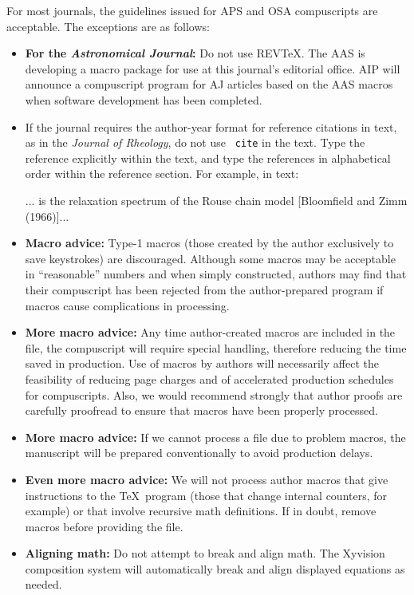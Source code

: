 For most journals, the guidelines issued for APS and OSA compuscripts are
acceptable.  The exceptions are as follows:
\begin{itemize}

\item{\bf For the {\em Astronomical Journal}:} Do not use REV\TeX .  The
AAS is developing a macro package for use at this journal's editorial
office.  AIP will announce a compuscript program for AJ articles based on
the AAS macros when software development has been completed.

\item If the journal requires the author-year format for reference
citations in text, as in the {\em Journal of Rheology}, do not use {\tt
cite} in the text.  Type the reference explicitly within the text, and type
the references in alphabetical order within the reference section. For
example, in text:


      ... is the relaxation spectrum of the Rouse chain model
      [Bloomfield and Zimm (1966)]...



\item {\bf Macro advice:} Type-1 macros (those created by the author
exclusively to save keystrokes) are discouraged. Although some macros may
be acceptable in ``reasonable'' numbers and when simply constructed,
authors may find that their compuscript has been rejected from the
author-prepared program if macros cause complications in processing.


\item {\bf More macro advice:} Any time author-created macros are included
in the file, the compuscript will require special handling, therefore
reducing the time saved in production.  Use of macros by authors will
necessarily affect the feasibility of reducing page charges and of
accelerated production schedules for compuscripts. Also, we would recommend
strongly that author proofs are carefully proofread to ensure that macros
have been properly processed.

\item {\bf More macro advice:} If we cannot process a file due to problem
macros, the manuscript will be prepared conventionally to avoid production
delays.

\item {\bf Even more macro advice:} We will not process author macros that
give instructions to the \TeX\ program (those that change internal
counters, for example) or that involve recursive math definitions.  If in
doubt, remove macros before providing the file.


\item {\bf Aligning math:} Do not attempt to break and align math.  The
Xyvision composition system will automatically break and align displayed
equations as needed.
      \end{itemize}


